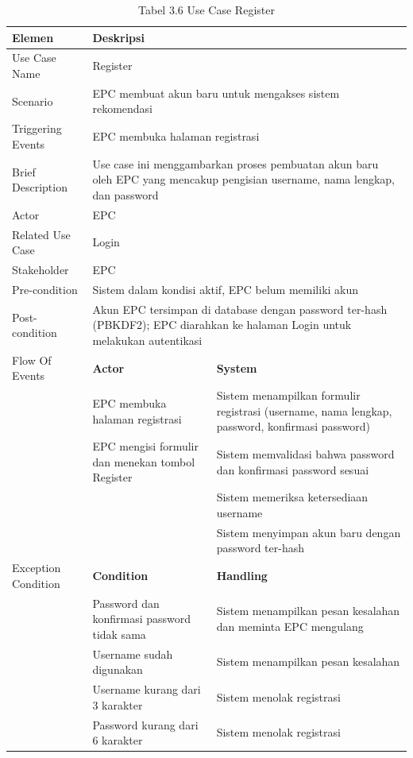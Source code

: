 \newlength{\ucdeskcol}
\setlength{\ucdeskcol}{\dimexpr 9.5cm + 2\tabcolsep + \arrayrulewidth\relax}
\begin{longtable}{|p{3.5cm}|p{4.5cm}|p{5cm}|}
\caption{Tabel 3.6 Use Case Register} \label{table:tab3.6} \\
\hline
\textbf{Elemen} & \multicolumn{2}{p{\ucdeskcol}|}{\textbf{Deskripsi}} \\
\hline
\endfirsthead
\endhead
\hline
\endfoot
Use Case Name & \multicolumn{2}{p{\ucdeskcol}|}{Register} \\
\hline
Scenario & \multicolumn{2}{p{\ucdeskcol}|}{EPC membuat akun baru untuk mengakses sistem rekomendasi} \\
\hline
Triggering Events & \multicolumn{2}{p{\ucdeskcol}|}{EPC membuka halaman registrasi} \\
\hline
Brief Description & \multicolumn{2}{p{\ucdeskcol}|}{Use case ini menggambarkan proses pembuatan akun baru oleh EPC yang mencakup pengisian username, nama lengkap, dan password} \\
\hline
Actor & \multicolumn{2}{p{\ucdeskcol}|}{EPC} \\
\hline
Related Use Case & \multicolumn{2}{p{\ucdeskcol}|}{Login} \\
\hline
Stakeholder & \multicolumn{2}{p{\ucdeskcol}|}{EPC} \\
\hline
Pre-condition & \multicolumn{2}{p{\ucdeskcol}|}{Sistem dalam kondisi aktif, EPC belum memiliki akun} \\
\hline
Post-condition & \multicolumn{2}{p{\ucdeskcol}|}{Akun EPC tersimpan di database dengan password ter-hash (PBKDF2); EPC diarahkan ke halaman Login untuk melakukan autentikasi} \\
\hline
Flow Of Events & \textbf{Actor} & \textbf{System} \\
\hline
 & EPC membuka halaman registrasi & Sistem menampilkan formulir registrasi (username, nama lengkap, password, konfirmasi password) \\
\hline
 & EPC mengisi formulir dan menekan tombol Register & Sistem memvalidasi bahwa password dan konfirmasi password sesuai \\
\hline
 & & Sistem memeriksa ketersediaan username \\
\hline
 & & Sistem menyimpan akun baru dengan password ter-hash \\
\hline
Exception Condition & \textbf{Condition} & \textbf{Handling} \\
\hline
 & Password dan konfirmasi password tidak sama & Sistem menampilkan pesan kesalahan dan meminta EPC mengulang \\
\hline
 & Username sudah digunakan & Sistem menampilkan pesan kesalahan \\
\hline
 & Username kurang dari 3 karakter & Sistem menolak registrasi \\
\hline
 & Password kurang dari 6 karakter & Sistem menolak registrasi \\
\hline
\end{longtable}

